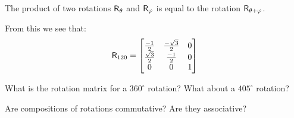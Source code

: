 \documentclass{ximera}
\begin{document}
\begin{theorem}
The product of two rotations $\mathsf{R}_\theta$ and $\mathsf{R}_\varphi$ is
equal to the rotation $\mathsf{R}_{\theta+\varphi}$.
\end{theorem}

From this we see that:
\[
\mathsf{R}_{120} =
\begin{bmatrix}
\frac{-1}{2} & \frac{-\sqrt{3}}{2} & 0\\
\frac{\sqrt{3}}{2} & \frac{-1}{2} & 0\\
0 & 0 & 1
\end{bmatrix}
\]

\begin{question} What is the rotation matrix for a $360^\circ$ rotation? What about a $405^\circ$ rotation?
\end{question}


\begin{question}
Are compositions of rotations commutative?  Are they
associative?
\end{question}
\end{document}
